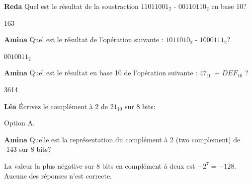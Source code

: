 \begin{Exercice}[10 minutes]\textbf{Reda}
Quel est le résultat de la soustraction $11011001_2$ - $00110110_2$ en base 10?
\begin{solution}
163
\end{solution}
\end{Exercice}

\begin{Exercice}[10 minutes]\textbf{Amina}
Quel est le résultat de l'opération suivante : $1011010_2$ - $1000111_2$?
\begin{solution}
$0010011_2$
\end{solution}
\end{Exercice}


\begin{Exercice}[10 minutes]\textbf{Amina}
Quel est le résultat en base 10 de l'opération suivante : $47_{10}$ + $DEF_{16}$ ?
\begin{solution}
    3614
\end{solution}
\end{Exercice}


\begin{Exercice}[10 minutes]\textbf{Léa}
Écrivez le complément à 2 de $21_{10}$ sur 8 bits:

\begin{solution}
Option A. 
\end{solution}
\end{Exercice}


\begin{Exercice}[10 minutes]\textbf{Amina}
Quelle est la représentation du complément à 2 (two complement) de -143 sur 8 bits?


\begin{solution}
La valeur la plus négative sur 8 bits en complément à deux est $-2^7=-128$. Aucune des réponses n'est correcte.
\end{solution}
\end{Exercice}
